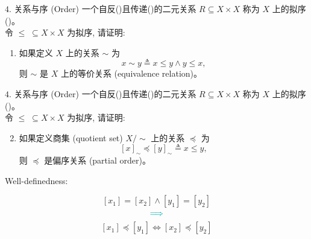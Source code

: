 \begin{frame}{}
  \begin{exampleblock}{$4.$ 关系与序 (Order)}
    一个自反()且传递()的二元关系 $R \subseteq X \times X$ 
    称为 $X$ 上的拟序 ()。\\[8pt]

    令 $\le \;\subseteq X \times X$ 为拟序, 请证明:
    \begin{enumerate}[(1)]
      \item 如果定义 $X$ 上的关系 $\sim$ 为
	\[
	  x \sim y \triangleq x \le y \land y \le x,
	\]
	则 $\sim$ 是 $X$ 上的等价关系 (equivalence relation)。
    \end{enumerate}
  \end{exampleblock}
\end{frame}

\begin{frame}{}
  \begin{exampleblock}{$4.$ 关系与序 (Order)}
    一个自反()且传递()的二元关系 $R \subseteq X \times X$ 
    称为 $X$ 上的拟序 ()。\\[8pt]

    令 $\le \;\subseteq X \times X$ 为拟序, 请证明:
    \begin{enumerate}[(1)]
      \setcounter{enumi}{1}
      \item 如果定义商集 (quotient set) $X/\sim$ 上的关系 $\preceq$ 为
	\[
	  [x]_{\sim} \preceq [y]_{\sim} \triangleq x \le y,
	\]
	则 $\preceq$ 是偏序关系 (partial order)。
    \end{enumerate}
  \end{exampleblock}

  \pause
  \vspace{0.60cm}
  \centerline{}
\end{frame}

\begin{frame}{}
  \centerline{\large Well-definedness: }

  \pause
  \vspace{0.50cm}
  \[
    [x_1] = [x_2] \land [y_1] = [y_2]
  \]
  \[
    \textcolor{teal}{\implies}
  \]
  \[
    [x_1] \preceq [y_1] \iff [x_2] \preceq [y_2]
  \]
\end{frame}

